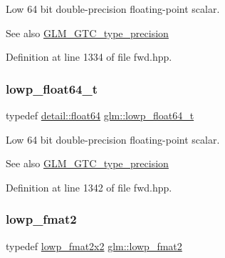 Low 64 bit double-\/precision floating-\/point scalar. \begin{DoxySeeAlso}{See also}
\hyperlink{group__gtc__type__precision}{G\+L\+M\+\_\+\+G\+T\+C\+\_\+type\+\_\+precision} 
\end{DoxySeeAlso}


Definition at line 1334 of file fwd.\+hpp.

\mbox{\label{group__gtc__type__precision_gac9d64f4e69d6c2eade41a848077866b5}} 
\subsubsection{\texorpdfstring{lowp\+\_\+float64\+\_\+t}{lowp\_float64\_t}}
{\footnotesize\ttfamily typedef \hyperlink{namespaceglm_1_1detail_a5a0a9a1be3fd5dbe6d47ae45c3022b06}{detail\+::float64} \hyperlink{group__gtc__type__precision_gac9d64f4e69d6c2eade41a848077866b5}{glm\+::lowp\+\_\+float64\+\_\+t}}

Low 64 bit double-\/precision floating-\/point scalar. \begin{DoxySeeAlso}{See also}
\hyperlink{group__gtc__type__precision}{G\+L\+M\+\_\+\+G\+T\+C\+\_\+type\+\_\+precision} 
\end{DoxySeeAlso}


Definition at line 1342 of file fwd.\+hpp.

\mbox{\label{group__gtc__type__precision_ga9bafb192cb7327d543ad55be2e6e675c}} 
\subsubsection{\texorpdfstring{lowp\+\_\+fmat2}{lowp\_fmat2}}
{\footnotesize\ttfamily typedef \hyperlink{group__gtc__type__precision_ga99367a30c64035d7e7f76410105d10e3}{lowp\+\_\+fmat2x2} \hyperlink{group__gtc__type__precision_ga9bafb192cb7327d543ad55be2e6e675c}{glm\+::lowp\+\_\+fmat2}}

